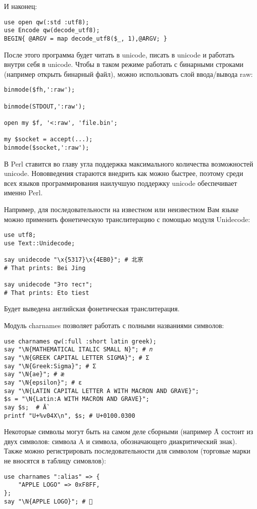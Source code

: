И наконец:
\begin{verbatim}
use open qw(:std :utf8);
use Encode qw(decode_utf8);
BEGIN{ @ARGV = map decode_utf8($_, 1),@ARGV; }
\end{verbatim}
После этого программа будет читать в unicode, писать в unicode и работать внутри себя в unicode. Чтобы в таком режиме работать с бинарными строками (например открыть бинарный файл), можно использовать слой ввода/вывода raw:
\begin{verbatim}
binmode($fh,':raw');

binmode(STDOUT,':raw');

open my $f, '<:raw', 'file.bin';

my $socket = accept(...);
binmode($socket,':raw');
\end{verbatim}
В Perl ставится во главу угла поддержка максимального количества возможностей unicode. Нововведения стараются внедрить как можно быстрее, поэтому среди всех языков программирования наилучшую поддержку unicode обеспечивает именно Perl.

Например, для последовательности на известном или неизвестном Вам языке можно применить фонетическую транслитерацию с помощью модуля Unidecode:
\begin{verbatim}
use utf8;
use Text::Unidecode;

say unidecode "\x{5317}\x{4EB0}"; # 北亰
# That prints: Bei Jing

say unidecode "Это тест";
# That prints: Eto tiest
\end{verbatim}
Будет выведена английская фонетическая транслитерация.

Модуль charnames позволяет работать с полными названиями символов:
\begin{verbatim}
use charnames qw(:full :short latin greek);
say "\N{MATHEMATICAL ITALIC SMALL N}"; # 𝑛
say "\N{GREEK CAPITAL LETTER SIGMA}"; # Σ
say "\N{Greek:Sigma}"; # Σ
say "\N{ae}"; # æ
say "\N{epsilon}"; # ε
say "\N{LATIN CAPITAL LETTER A WITH MACRON AND GRAVE}";
$s = "\N{Latin:A WITH MACRON AND GRAVE}";
say $s;  # Ā̀
printf "U+%v04X\n", $s; # U+0100.0300
\end{verbatim}
Некоторые символы могут быть на самом деле сборными (например Ā̀  состоит из двух символов: символа A и символа, обозначающего диакритический знак). Также можно регистрировать последовательности для символом (торговые марки не вносятся в таблицу симовлов):
\begin{verbatim}
use charnames ":alias" => {
    "APPLE LOGO" => 0xF8FF,
};
say "\N{APPLE LOGO}"; # 
\end{verbatim}

